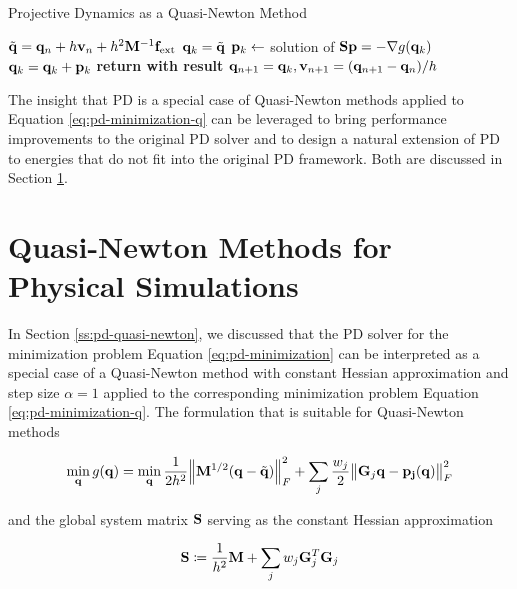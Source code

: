 \begin{algorithm}
\caption{Projective Dynamics as a Quasi-Newton Method}\label{alg:pd-qn}
\begin{algorithmic}
\State $\tilde{\mathbf{q}} = \mathbf{q}_n + h\mathbf{v}_n + h^2\mathbf{M}^{-1}\mathbf{f}_{\text{ext}}$
\State $\mathbf{q}_k = \tilde{\mathbf{q}}$
\State $\mathbf{p}_k \gets$ solution of $\mathbf{S}\mathbf{p} = -\nabla g(\mathbf{q}_k)$
\State $\mathbf{q}_k = \mathbf{q}_k + \mathbf{p}_k$
\EndFor
\State \textbf{return with result } $\mathbf{q}_{n+1} = \mathbf{q}_k, \mathbf{v}_{n+1} = (\mathbf{q}_{n+1} - \mathbf{q}_n)/h$
\EndProcedure
\end{algorithmic}
\end{algorithm}

The insight that PD is a special case of Quasi-Newton methods applied to Equation \ref{eq:pd-minimization-q} can be leveraged to
bring performance improvements to the original PD solver and to design a natural extension of PD to energies that do not fit 
into the original PD framework. Both are discussed in Section \ref{s:qn-rts}.

\section{Quasi-Newton Methods for Physical Simulations}\label{s:qn-rts}
In Section \ref{ss:pd-quasi-newton}, we discussed that the PD solver for the minimization problem Equation \ref{eq:pd-minimization}
can be interpreted as a special case of a Quasi-Newton method with constant Hessian approximation and step size $\alpha = 1$
applied to the corresponding minimization problem Equation \ref{eq:pd-minimization-q}. The formulation that is suitable for Quasi-Newton
methods

\begin{equation}\label{eq:pd-minimization-q2}
    \min_{\mathbf{q}} g(\mathbf{q}) = 
    \min_{\mathbf{q}} \frac{1}{2h^2} \norm{\mathbf{M}^{1/2}(\mathbf{q} - \tilde{\mathbf{q}})}^2_F + \sum_j \frac{w_j}{2} \norm{\mathbf{G}_j\mathbf{q}
    - \mathbf{p_j}(\mathbf{q})}^2_F
\end{equation}

\noindent and the global system matrix $\mathbf{S}$ serving as the constant Hessian approximation

\begin{equation}\label{eq:global-matrix}
    \mathbf{S} \coloneqq \frac{1}{h^2}\mathbf{M} + \sum_j w_j \mathbf{G}_j^T \mathbf{G}_j  
\end{equation}

